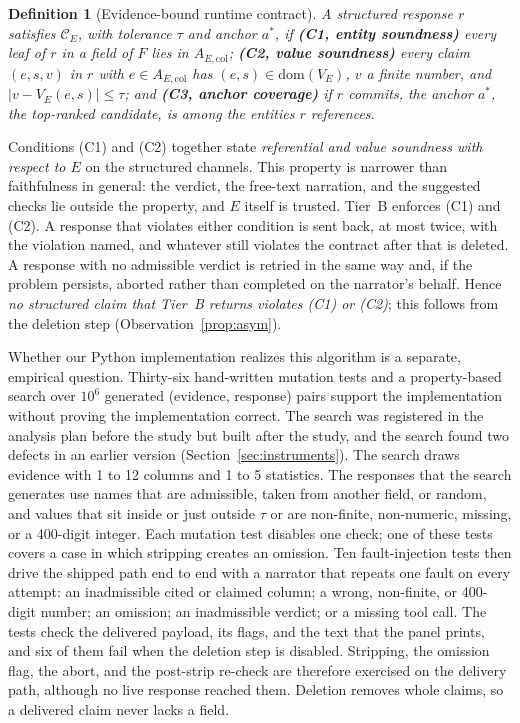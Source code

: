 \documentclass[10pt,twocolumn]{article}
\newtheorem{definitionx}{Definition}
\begin{document}
\begin{definitionx}[Evidence-bound runtime contract]\label{def:contract}
A structured response $r$ \emph{satisfies} $\mathcal{C}_E$, with tolerance
$\tau$ and anchor $a^*$, if \textbf{(C1, entity soundness)} every leaf of
$r$ in a field of $F$ lies in $A_{E,\mathrm{col}}$; \textbf{(C2, value
soundness)} every claim $(e,s,v)$ in $r$ with $e \in A_{E,\mathrm{col}}$ has
$(e,s) \in \mathrm{dom}(V_E)$, $v$ a finite number, and
$|v - V_E(e,s)| \le \tau$; and \textbf{(C3, anchor coverage)} if $r$
commits, the anchor $a^*$, the top-ranked candidate, is among the entities
$r$ references.
\end{definitionx}

Conditions (C1) and (C2) together state \emph{referential and value soundness
with respect to $E$} on the structured channels. This property is narrower
than faithfulness in general: the verdict, the free-text narration, and the
suggested checks lie outside the property, and $E$ itself is trusted. Tier~B
enforces (C1) and (C2). A response that violates either condition is sent
back, at most twice, with the violation named, and whatever still violates the
contract after that is deleted. A response with no admissible verdict is
retried in the same way and, if the problem persists, aborted rather than
completed on the narrator's behalf. Hence \emph{no structured claim that
Tier~B returns violates (C1) or (C2)}; this follows from the deletion step
(Observation~\ref{prop:asym}).

Whether our Python implementation realizes this algorithm is a separate,
empirical question. Thirty-six hand-written mutation tests and a
property-based search over $10^6$ generated (evidence, response) pairs support
the implementation without proving the implementation correct. The search was
registered in the analysis plan before the study but built after the study,
and the search found two defects in an earlier version
(Section~\ref{sec:instruments}). The search draws evidence with 1 to 12
columns and 1 to 5 statistics. The responses that the search generates use
names that are admissible, taken from another field, or random, and values
that sit inside or just outside $\tau$ or are non-finite, non-numeric,
missing, or a 400-digit integer. Each mutation test disables one check; one of
these tests covers a case in which stripping creates an omission. Ten
fault-injection tests then drive the shipped path end to end with a narrator
that repeats one fault on every attempt: an inadmissible cited or claimed
column; a wrong, non-finite, or 400-digit number; an omission; an
inadmissible verdict; or a missing tool call. The tests check the delivered
payload, its flags, and the text that the panel prints, and six of them fail
when the deletion step is disabled. Stripping, the omission flag, the abort,
and the post-strip re-check are therefore exercised on the delivery path,
although no live response reached them. Deletion removes whole claims, so a
delivered claim never lacks a field.
\end{document}
